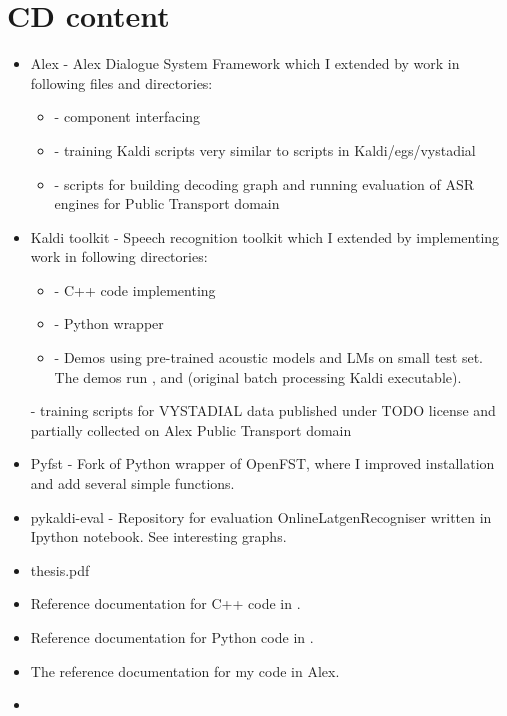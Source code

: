 \chapter{CD content}
\label{cha:cd_content}

\begin{itemize}
    \item Alex - Alex Dialogue System Framework which I extended by work in following files and directories:
        \begin{itemize}
            \item {} - component interfacing 
            \item {} - training Kaldi scripts very similar to scripts in Kaldi/egs/vystadial 
            \item {} - scripts for building decoding graph  and running evaluation of ASR engines for Public Transport domain 
        \end{itemize}
    \item Kaldi toolkit - Speech recognition toolkit which I extended by implementing work in following directories:
        \begin{itemize}
            \item {} - C++ code implementing 
            \item {} - Python wrapper 
            \item {} - Demos using pre-trained acoustic models and LMs on small test set. The demos run ,  and (original batch processing Kaldi executable).
        \end{itemize}  - training scripts for VYSTADIAL data published under TODO license and partially collected on Alex Public Transport domain 
    \item Pyfst - Fork of Python wrapper of OpenFST, where I improved installation and add several simple functions.
    \item pykaldi-eval - Repository for evaluation OnlineLatgenRecogniser written in Ipython notebook. See interesting graphs.
    \item thesis.pdf
    \item Reference documentation for C++ code in .
    \item Reference documentation for Python code in .
    \item The reference documentation for my code in Alex.
    \item {}
\end{itemize}
